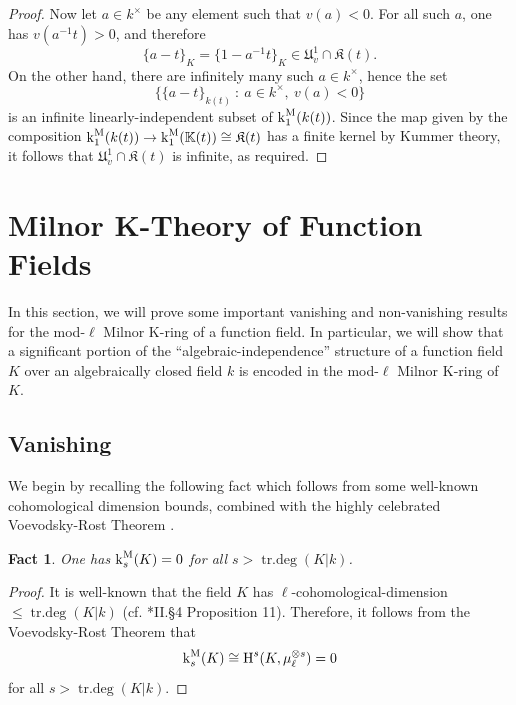 \documentclass[11pt]{amsart}
\newtheorem{fact}[proposition]{Fact}
\theoremstyle{definition}
\theoremstyle{remark}
\numberwithin{equation}{section}
\DeclareMathOperator{\trdeg}{tr.deg}
\renewcommand{\H}{\operatorname{H}}
\newcommand{\Kbb}{\mathbb{K}}
\newcommand{\Kfrak}{\mathfrak{K}}
\newcommand{\Ufrak}{\mathfrak{U}}
\renewcommand{\k}{\operatorname{k}^{\rm M}}
\begin{document}
\begin{proof}
  Now let $a \in k^\times$ be any element such that $v(a) < 0$.
  For all such $a$, one has $v(a^{-1} t) > 0$, and therefore
  \[ \{a-t\}_K = \{1-a^{-1}t\}_K \in \Ufrak_v^1 \cap \Kfrak(t).\]
  On the other hand, there are infinitely many such $a \in k^\times$, hence the set
  \[ \{\{a-t\}_{k(t)} \ : \ a \in k^\times, \ v(a) < 0 \} \]
  is an infinite linearly-independent subset of $\k_1(k(t))$.
  Since the map given by the composition $\k_1(k(t)) \rightarrow \k_1(\Kbb(t)) \cong \Kfrak(t)$ has a finite kernel by Kummer theory, it follows that $\Ufrak_v^1 \cap \Kfrak(t)$ is infinite, as required.
\end{proof}

\section{Milnor K-Theory of Function Fields}
\label{section: milnorff}


In this section, we will prove some important vanishing and non-vanishing results for the mod-$\ell$ Milnor K-ring of a function field.
In particular, we will show that a significant portion of the ``algebraic-independence'' structure of a function field $K$ over an algebraically closed field $k$ is encoded in the mod-$\ell$ Milnor K-ring of $K$.

\subsection{Vanishing}
\label{subsection: milnorff / vanishing}

We begin by recalling the following fact which follows from some well-known cohomological dimension bounds, combined with the highly celebrated Voevodsky-Rost Theorem \cite{Voevodsky:2011} \cite{Rost:1998} \cite{Weibel:2009}.

\begin{fact}
\label{fact: milnorff / vanishing / vanishing-B-K}
  One has $\k_s(K) = 0$ for all $s > \trdeg(K|k)$.
\end{fact}
\begin{proof}
  It is well-known that the field $K$ has $\ell$-cohomological-dimension $\leq \trdeg(K|k)$ (cf. \cite{Serre:2002}*{II.\S4 Proposition 11}).
  Therefore, it follows from the Voevodsky-Rost Theorem \cite{Voevodsky:2011} \cite{Rost:1998} \cite{Weibel:2009} that
  \[ \k_s(K) \cong \H^s(K,\mu_\ell^{\otimes s}) = 0\]
  for all $s > \trdeg(K|k)$.
\end{proof}
\end{document}
